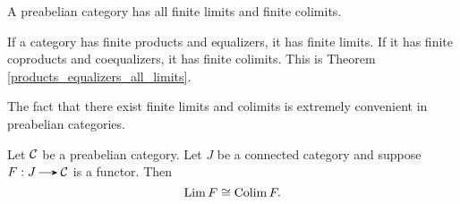 \begin{proposition}
    A preabelian category has all finite limits and finite colimits.
\end{proposition}

\begin{prf}
    If a category has finite products and equalizers, it has finite limits. If 
    it has finite coproducts and coequalizers, it has finite colimits. This is 
    Theorem \ref{products_equalizers_all_limits}.
\end{prf}

The fact that there exist finite limits and colimits is extremely convenient 
in preabelian categories. 


\begin{proposition}
    Let $\mathcal{C}$ be a preabelian category.
    Let $J$ be a connected category and suppose $F: J \to \cc$ is a functor. 
    Then 
    \[
        \operatorname*{\mathrm{Lim }} F \cong \operatorname*{\mathrm{Colim }} F.   
    \]
\end{proposition}

